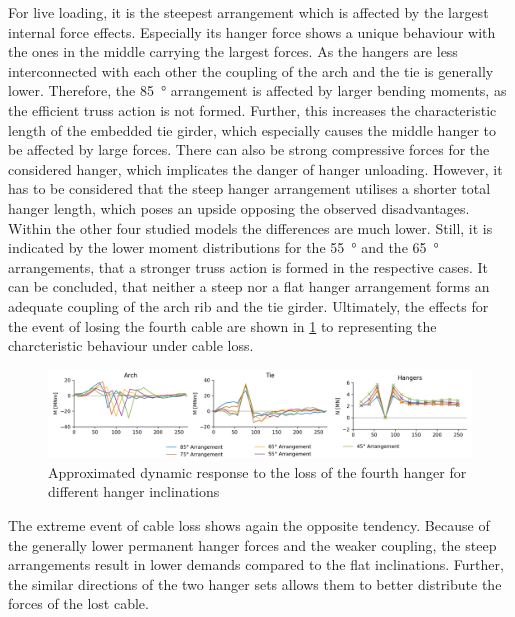 For live loading, it is the steepest arrangement which is affected by the largest internal force effects. Especially its hanger force shows a unique behaviour with the ones in the middle carrying the largest forces. As the hangers are less interconnected with each other the coupling of the arch and the tie is generally lower. Therefore, the \SI{85}{\degree} arrangement is affected by larger bending moments, as the efficient truss action is not formed. Further, this increases the characteristic length of the embedded tie girder, which especially causes the middle hanger to be affected by large forces. There can also be strong compressive forces for the considered hanger, which implicates the danger of hanger unloading. However, it has to be considered that the steep hanger arrangement utilises a shorter total hanger length, which poses an upside opposing the observed disadvantages. Within the other four studied models the differences are much lower. Still, it is indicated by the lower moment distributions for the \SI{55}{\degree} and the \SI{65}{\degree} arrangements, that a stronger truss action is formed in the respective cases. It can be concluded, that neither a steep nor a flat hanger arrangement forms an adequate coupling of the arch rib and the tie girder. 
Ultimately, the effects for the event of losing the fourth cable are shown in \cref{fig:inclination_cable} to representing the charcteristic behaviour under cable loss.

\begin{figure}[H]
    \centering
    \includegraphics[trim={1cm 0 1cm 0},clip, width=\textwidth]{calculations/parallel arrangement comparison/cable loss 4_plot.png}
    \caption{Approximated dynamic response to the loss of the fourth hanger for different hanger inclinations}
    \label{fig:inclination_cable}
\end{figure}

The extreme event of cable loss shows again the opposite tendency. Because of the generally lower permanent hanger forces and the weaker coupling, the steep arrangements result in lower demands compared to the flat inclinations. Further, the similar directions of the two hanger sets allows them to better distribute the forces of the lost cable. 

